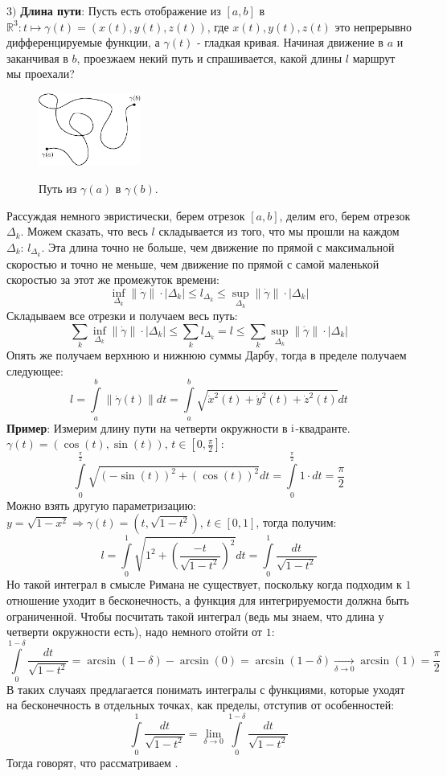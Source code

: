 \documentclass[12pt]{article}
\newcommand{\RN}[1]{%
	\textup{\uppercase\expandafter{\romannumeral#1}}%
}
\newcommand{\MR}{\mathbb{R}}
\theoremstyle{definition}
\newcommand{\ddint}[2]{\displaystyle\int\limits_{#1}^{#2}}
\begin{document}
$3)$ \textbf{Длина пути}: Пусть есть отображение из $[a,b]$ в $\MR^3 \colon t \mapsto \gamma(t) = (x(t),y(t),z(t))$, где $x(t),y(t), z(t)$ это непрерывно дифференцируемые функции, а $\gamma(t)$ - гладкая кривая. Начиная движение в $a$ и заканчивая в $b$, проезжаем некий путь и спрашивается, какой длины $l$ маршрут мы проехали?
\begin{figure}[H]
	\centering
	\includegraphics[width=0.30\textwidth]{26_5.eps}
	\label{26_5}
	\caption{Путь из $\gamma(a)$ в $\gamma(b)$.}
	\label{fig:Длина пути}
\end{figure}
Рассуждая немного эвристически, берем отрезок $[a,b]$, делим его, берем отрезок $\Delta_k$. Можем сказать, что весь $l$ складывается из того, что мы прошли на каждом $\Delta_k$: $l_{\Delta_k}$. Эта длина точно не больше, чем движение по прямой с максимальной скоростью и точно не меньше, чем движение по прямой с самой маленькой скоростью за этот же промежуток времени:
$$
	\inf\limits_{\Delta_k}\|\dot{\gamma}\|{\cdot}|\Delta_k| \leq l_{\Delta_k} \leq \sup\limits_{\Delta_k}\|\dot{\gamma}\|{\cdot}|\Delta_k|
$$
Складываем все отрезки и получаем весь путь:
$$
	\sum\limits_k\inf\limits_{\Delta_k}\|\dot{\gamma}\|{\cdot}|\Delta_k| \leq \sum\limits_k l_{\Delta_k} = l \leq \sum\limits_k\sup\limits_{\Delta_k}\|\dot{\gamma}\|{\cdot}|\Delta_k|
$$
Опять же получаем верхнюю и нижнюю суммы Дарбу, тогда в пределе получаем следующее:
$$
	l = \ddint{a}{b}\|\dot{\gamma}(t)\|dt = \ddint{a}{b}\sqrt{\dot{x}^2(t) + \dot{y}^2(t) + \dot{z}^2(t)}dt
$$
\textbf{Пример}: Измерим длину пути на четверти окружности в $\RN{1}$-квадранте. $\gamma(t) = (\cos(t), \sin(t)), \, t \in [0,\tfrac{\pi}{2}]$:
$$
	\ddint{0}{\tfrac{\pi}{2}}\sqrt{(-\sin(t))^2 + (\cos(t))^2}dt  = \ddint{0}{\tfrac{\pi}{2}}1{\cdot}dt = \dfrac{\pi}{2}
$$
Можно взять другую параметризацию: $y = \sqrt{1-x^2} \Rightarrow \gamma(t) = (t,\sqrt{1-t^2}), \, t \in [0,1]$, тогда получим:
$$
	l = \ddint{0}{1}\sqrt{1^2 + \left(\dfrac{-t}{\sqrt{1 - t^2}}\right)^2 }dt = \ddint{0}{1}\dfrac{dt}{\sqrt{1-t^2}}
$$
Но такой интеграл в смысле Римана не существует, поскольку когда подходим к $1$ отношение уходит в бесконечность, а функция для интегрируемости должна быть ограниченной. Чтобы посчитать такой интеграл (ведь мы знаем, что длина у четверти окружности есть), надо немного отойти от $1$:
$$
	\ddint{0}{1-\delta}\dfrac{dt}{\sqrt{1-t^2}} = \arcsin(1-\delta) - \arcsin(0) = \arcsin(1-\delta) \xrightarrow[\delta \to 0]{} \arcsin(1) = \dfrac{\pi}{2}
$$
В таких случаях предлагается понимать интегралы с функциями, которые уходят на бесконечность в отдельных точках, как пределы, отступив от особенностей:
$$
	\ddint{0}{1}\dfrac{dt}{\sqrt{1-t^2}} = \lim\limits_{\delta \to 0} \ddint{0}{1 - \delta}\dfrac{dt}{\sqrt{1-t^2}}
$$
Тогда говорят, что рассматриваем .
\end{document}
